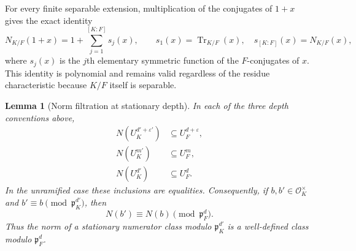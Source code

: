 \documentclass[11pt]{amsart}
\newtheorem{lemma}[theorem]{Lemma}
\theoremstyle{definition}
\theoremstyle{remark}
\newcommand{\cO}{\mathcal O}
\newcommand{\p}{\mathfrak p}
\newcommand{\Tr}{\operatorname{Tr}}
\begin{document}
For every finite separable extension, multiplication of the conjugates
of $1+x$ gives the exact identity
\begin{equation}\label{eq:norm-expansion}
 N_{K/F}(1+x)
 =1+\sum_{j=1}^{[K:F]}s_j(x),
 \qquad s_1(x)=\Tr_{K/F}(x),\quad
 s_{[K:F]}(x)=N_{K/F}(x),
\end{equation}
where $s_j(x)$ is the $j$th elementary symmetric function of the
$F$-conjugates of $x$.  This identity is polynomial and remains valid
regardless of the residue characteristic because $K/F$ itself is
separable.

\begin{lemma}[Norm filtration at stationary depth]
\label{lem:stationary-depth-norm}
In each of the three depth conventions above,
\begin{align}
 N(U_K^{d'+\varepsilon'})&\subseteq U_F^{d+\varepsilon},
                                                        \label{eq:stationary-depth-first-inclusion}\\
 N(U_K^{m'})&\subseteq U_F^m,             \label{eq:stationary-depth-second-inclusion}\\
 N(U_K^{d'})&\subseteq U_F^d.             \label{eq:stationary-parameter-ambiguity}
\end{align}
In the unramified case these inclusions are equalities.  Consequently,
if $b,b'\in\cO_K^\times$ and
$b'\equiv b\pmod{\p_K^{d'}}$, then
\begin{equation}\label{eq:norm-of-stationary-class-well-defined}
 N(b')\equiv N(b)\pmod{\p_F^d}.
\end{equation}
Thus the norm of a stationary numerator class modulo $\p_K^{d'}$ is a
well-defined class modulo $\p_F^d$.
\end{lemma}
\end{document}
